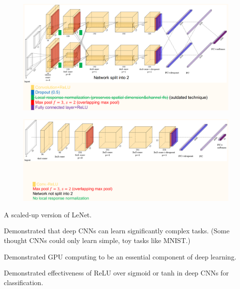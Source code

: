 \begin{definition}
    \begin{figure}[H]
        \centering
        \includegraphics[width=1.0\textwidth]{.././assets/7.5.png}
    \end{figure}
\end{definition}

\begin{definition}
    \begin{figure}[H]
        \centering
        \includegraphics[width=1.0\textwidth]{.././assets/7.6.png}
    \end{figure}
\end{definition}

\begin{concept}
    A scaled-up version of LeNet.

    Demonstrated that deep CNNs can learn significantly complex tasks. (Some thought CNNs could only learn simple, toy tasks like MNIST.)

    Demonstrated GPU computing to be an essential component of deep learning.

    Demonstrated effectiveness of ReLU over sigmoid or tanh in deep CNNs for classification.
\end{concept}

